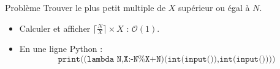 \begin{frame}
    \frametitle{\problemtitle}
    \begin{block}{Problème}
        Trouver le plus petit multiple de $X$ supérieur ou égal à $N$.
    \end{block}
    \pause
    \begin{itemize}[<+->]
        \item Calculer et afficher $\lceil \frac{N}{X} \rceil \times X$ : $\mathcal{O}(1)$.
        \item En une ligne Python :
        \[
        \texttt{print((lambda N,X:-N\%X+N)(int(input()),int(input())))}
        \]
    \end{itemize}

\end{frame}